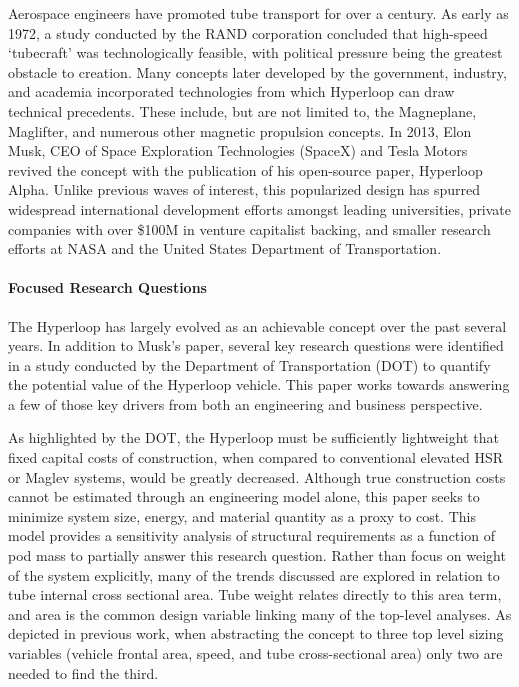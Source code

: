     Aerospace engineers have promoted tube transport for over a century.
    As early as 1972, a study conducted by the RAND corporation concluded that
    high-speed `tubecraft' was technologically feasible, with political pressure being the greatest
    obstacle to creation.\cite{RAND} Many concepts later developed by
    the government, industry, and academia incorporated technologies from which
    Hyperloop can draw technical precedents.
    These include, but are not limited to, the Magneplane, Maglifter, and numerous
    other magnetic propulsion concepts. In 2013, Elon Musk, CEO of Space Exploration
    Technologies (SpaceX) and Tesla Motors revived the concept with the publication
    of his open-source paper, Hyperloop Alpha.\cite{Musk}
    Unlike previous waves of interest, this popularized design has spurred widespread international
    development efforts amongst leading universities, private companies with over
    \$100M in venture capitalist backing, and smaller research efforts at NASA and the
    United States Department of Transportation. \cite{Chin}

\paragraph{Focused Research Questions}

    The Hyperloop has largely evolved as an achievable concept over the past several years.
    In addition to Musk's paper, several key research questions were identified in a study conducted
    by the Department of Transportation (DOT) to quantify the potential value of the
    Hyperloop vehicle. \cite{Volpe} This paper works towards answering a few of
    those key drivers from both an engineering and business perspective.

    As highlighted by the DOT, the Hyperloop must be sufficiently lightweight
    that fixed capital costs of construction, when compared to conventional
    elevated HSR or Maglev systems, would be greatly decreased.
    Although true construction costs cannot be estimated through an engineering
    model alone, this paper seeks to minimize system size, energy, and material
    quantity as a proxy to cost. This model provides a sensitivity
    analysis of structural requirements as a function of pod mass to partially
    answer this research question. Rather than focus on weight of the system explicitly,
    many of the trends discussed are explored in relation to tube internal
    cross sectional area. Tube weight relates directly to this area term, and
    area is the common design variable linking many of the top-level
    analyses. As depicted in previous work,
    \cite{Chin} when abstracting the concept to three top level
    sizing variables (vehicle frontal area, speed, and tube cross-sectional area)
    only two are needed to find the third.


